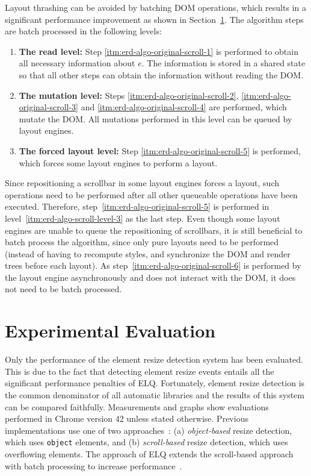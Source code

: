 \documentclass[sigplan,9pt]{acmart}
\newcommand{\elq}{ELQ}
\begin{document}
    Layout thrashing can be avoided by batching DOM operations, which results in a significant performance improvement as shown in Section~\ref{sec:eval}.
    The algorithm steps are batch processed in the following levels:
    \begin{enumerate}
      \item\label{itm:erd-algo-scroll-level-1}
        \textbf{The read level:}
        Step \ref{itm:erd-algo-original-scroll-1} is performed to obtain all necessary information about $e$.
        The information is stored in a shared state so that all other steps can obtain the information without reading the DOM.
      \item\label{itm:erd-algo-scroll-level-2}
        \textbf{The mutation level:}
        Steps \ref{itm:erd-algo-original-scroll-2}, \ref{itm:erd-algo-original-scroll-3} and \ref{itm:erd-algo-original-scroll-4} are performed, which mutate the DOM.
        All mutations performed in this level can be queued by layout engines.
      \item\label{itm:erd-algo-scroll-level-3}
        \textbf{The forced layout level:}
        Step \ref{itm:erd-algo-original-scroll-5} is performed, which forces some layout engines to perform a layout.
    \end{enumerate}

    Since repositioning a scrollbar in some layout engines forces a layout, such operations need to be performed after all other queueable operations have been executed.
    Therefore, step~\ref{itm:erd-algo-original-scroll-5} is performed in level~\ref{itm:erd-algo-scroll-level-3} as the last step.
    Even though some layout engines are unable to queue the repositioning of scrollbars, it is still beneficial to batch process the algorithm, since only pure layouts need to be performed (instead of having to recompute styles, and synchronize the DOM and render trees before each layout).
    As step~\ref{itm:erd-algo-original-scroll-6} is performed by the layout engine asynchronously and does not interact with the DOM, it does not need to be batch processed.

  \section{Experimental Evaluation}\label{sec:eval}
    Only the performance of the element resize detection system has
    been evaluated.  This is due to the fact that detecting element
    resize events entails all the significant performance penalties of
    \elq{}.  Fortunately, element resize detection is the common
    denominator of all automatic libraries and the results of this
    system can be compared faithfully.  Measurements and graphs show
    evaluations performed in Chrome version 42 unless stated
    otherwise.  Previous implementations use one of two
    approaches~\cite{backalley}: (a) {\em object-based} resize
    detection, which uses \verb|object| elements, and (b) {\em
      scroll-based} resize detection, which uses overflowing elements.
    The approach of \elq{} extends the scroll-based approach with
    batch processing to increase performance~\cite{WienerEH15}.
\end{document}
